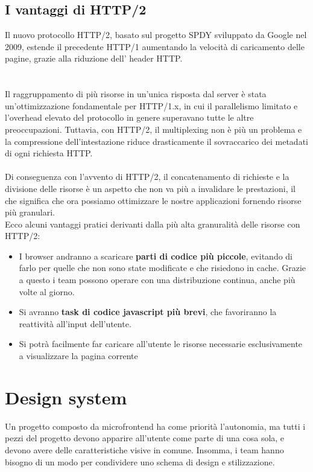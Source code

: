 \subsection{I vantaggi di HTTP/2}
Il nuovo protocollo HTTP/2, basato sul progetto SPDY sviluppato da Google nel 2009, estende il precedente HTTP/1
aumentando la velocità di caricamento delle pagine, grazie alla riduzione dell' header HTTP.
\\\\\\
Il raggruppamento di più risorse in un'unica risposta dal server è stata un'ottimizzazione fondamentale per HTTP/1.x, in cui 
il parallelismo limitato e l'overhead elevato del protocollo in genere superavano tutte le altre preoccupazioni.
Tuttavia, con HTTP/2, il multiplexing non è più un problema e la compressione dell'intestazione 
riduce drasticamente il sovraccarico dei metadati di ogni richiesta HTTP.\cite{http2}
\\\\
Di conseguenza con l'avvento di HTTP/2, il concatenamento di richieste e la divisione delle risorse è un aspetto che non 
 va più a invalidare le prestazioni, il che significa che ora possiamo ottimizzare le nostre applicazioni fornendo risorse 
 più granulari.
 \\
 Ecco alcuni vantaggi pratici derivanti dalla più alta granuralità delle risorse con HTTP/2:

 \begin{itemize}
     \item I browser andranno a scaricare \textbf{parti di codice più piccole}, evitando di farlo per 
     quelle che non sono state modificate e che risiedono in cache. 
     Grazie a questo i team possono operare con una distribuzione continua, anche più volte al giorno.
     \item Si avranno \textbf{task di codice javascript più brevi}, che favoriranno la reattività all'input dell'utente.
     \item Si potrà facilmente far caricare all'utente le risorse necessarie esclusivamente
      a visualizzare la pagina corrente
 \end{itemize}

\pagebreak


 \section{Design system}

 Un progetto composto da microfrontend ha come priorità l’autonomia, ma tutti i pezzi del progetto devono apparire 
 all’utente come parte di una cosa sola, e devono avere delle caratteristiche visive in comune. Insomma, i team hanno 
 bisogno di un modo per condividere uno schema di design e stilizzazione.

